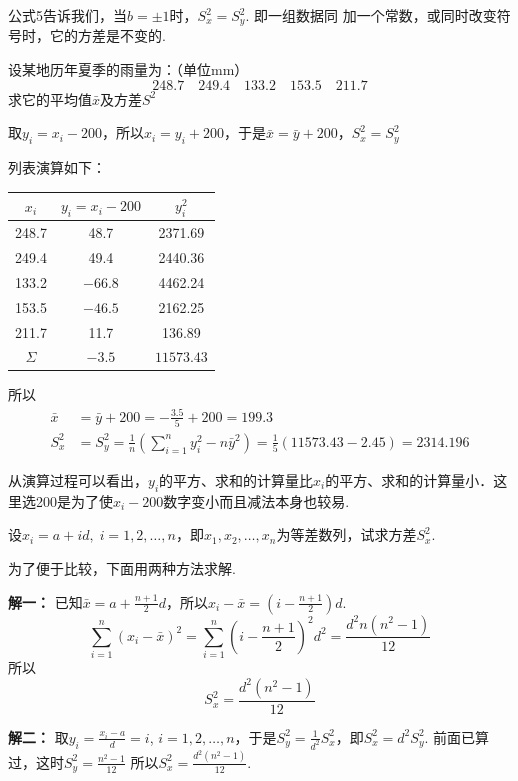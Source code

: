 公式5告诉我们，当$b=\pm1$时，$S_x^2=S_y^2$. 即一组数据同
加一个常数，或同时改变符号时，它的方差是不变的.

\begin{example}
设某地历年夏季的雨量为：（单位mm）
\[248.7\quad 249.4\quad 133.2\quad 153.5\quad 211.7 \]
求它的平均值$\bar x$及方差$S^2$
\end{example}

取$y_i=x_i-200$，所以$x_i=y_i+200$，于是$\bar x=\bar y+200$，$S^2_x=S^2_y$

列表演算如下：
\begin{center}
\begin{tabular}{ccc}
\hline 
$x_i$ & $y_i=x_i-200$ & $y^2_i$\\
\hline
248.7  & 48.7  & 2371.69\\
249.4& 49.4&2440.36\\
133.2&$-66.8$&4462.24\\
153.5&$-46.5$&2162.25\\
211.7&11.7&136.89\\
\hline
$\Sigma$ &$-3.5$& $11573.43$\\
\hline
\end{tabular}
\end{center}

所以
\[\begin{split}
    \bar x&=\bar y+200=-\frac{3.5}{5}+200=199.3\\
S^2_x&=S^2_y=\frac{1}{n}\left(\sum^n_{i=1} y^2_i-n\bar y^2\right)=\frac{1}{5}(11573.43-2.45)=2314.196
\end{split}
    \]

从演算过程可以看出，$y_i$的平方、求和的计算量比$x_i$的平方、求和的计算量小．这里选200是为了使$x_i-200$数字变小而且减法本身也较易.

\begin{example}
    设$x_i=a+id,\; i=1,2,\ldots,n$，即$x_1,x_2,\ldots,x_n$为等差数列，试求方差$S^2_x$.
\end{example}

为了便于比较，下面用两种方法求解.

\textbf{解一：} 已知$\bar x=a+\frac{n+1}{2}d$，所以$x_i-\bar x=\left(i-\frac{n+1}{2}\right)d$.
\[\sum^n_{i=1}(x_i-\bar x)^2 =\sum^n_{i=1}\left(i-\frac{n+1}{2}\right)^2 d^2=\frac{d^2n(n^2-1)}{12} \]
所以
\[S^2_x=\frac{d^2(n^2-1)}{12} \]

\textbf{解二：} 取$y_i=\frac{x_i-a}{d}=i$, $i=1,2,\ldots,n$，于是$S^2_y=\frac{1}{d^2}S^2_x$，即$S^2_x=d^2S^2_y$. 前面已算过，这时$S^2_y=\frac{n^2-1}{12}$
所以$S^2_x=\frac{d^2(n^2-1)}{12}$.

